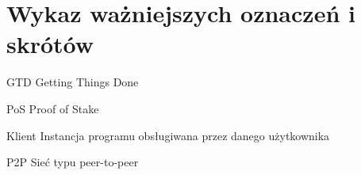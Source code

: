 \chapter*{Wykaz ważniejszych oznaczeń i skrótów}

\begin{abbrev}
\item[GTD] Getting Things Done
\item[PoS] Proof of Stake
\item[Klient] Instancja programu obsługiwana przez danego użytkownika
\item[P2P] Sieć typu peer-to-peer
\end{abbrev}

